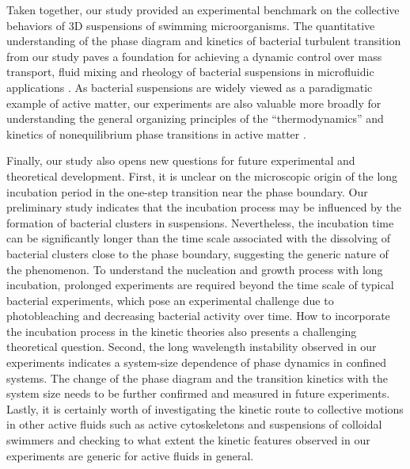 Taken together, our study provided an experimental benchmark on the collective behaviors of 3D suspensions of swimming microorganisms. The quantitative understanding of the phase diagram and kinetics of bacterial turbulent transition from our study paves a foundation for achieving a dynamic control over mass transport, fluid mixing and rheology of bacterial suspensions in microfluidic applications \cite{Peng2016, Lopez2015}. As bacterial suspensions are widely viewed as a paradigmatic example of active matter, our experiments are also valuable more broadly for understanding the general organizing principles of the ``thermodynamics'' and kinetics of nonequilibrium phase transitions in active matter \cite{Takatori2015}.

Finally, our study also opens new questions for future experimental and theoretical development. First, it is unclear on the microscopic origin of the long incubation period in the one-step transition near the phase boundary. Our preliminary study indicates that the incubation process may be influenced by the formation of bacterial clusters in suspensions. Nevertheless, the incubation time can be significantly longer than the time scale associated with the dissolving of bacterial clusters close to the phase boundary, suggesting the generic nature of the phenomenon. To understand the nucleation and growth process with long incubation, prolonged experiments are required beyond the time scale of typical bacterial experiments, which pose an experimental challenge due to photobleaching and decreasing bacterial activity over time. How to incorporate the incubation process in the kinetic theories also presents a challenging theoretical question. Second, the long wavelength instability observed in our experiments indicates a system-size dependence of phase dynamics in confined systems. The change of the phase diagram and the transition kinetics with the system size needs to be further confirmed and measured in future experiments.
Lastly, it is certainly worth of investigating the kinetic route to collective motions in other active fluids such as active cytoskeletons \cite{Martinez-Prat2019} and suspensions of colloidal swimmers \cite{Bricard2013} and checking to what extent the kinetic features observed in our experiments are generic for active fluids in general.

